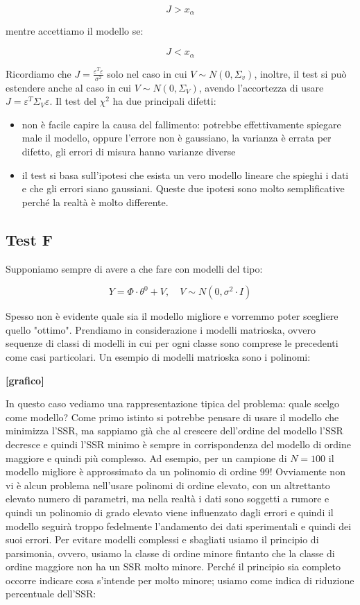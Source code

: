     \[ J>x_\alpha \]

mentre accettiamo il modello se:

    \[ J<x_\alpha \]

Ricordiamo che $J=\frac{\varepsilon^T\varepsilon}{\sigma^2}$ solo nel caso in cui $V\sim N(0,\Sigma_v)$, inoltre, il test si può estendere anche al caso in cui $V\sim N(0,\Sigma_V)$, avendo l'accortezza di usare $J=\varepsilon^T\Sigma_V\varepsilon$. \newline
Il test del $\chi^2$ ha due principali difetti:
\begin{itemize}
  \item non è facile capire la causa del fallimento: potrebbe effettivamente spiegare male il modello, oppure l'errore non è gaussiano, la varianza è errata per difetto, gli errori di misura hanno varianze diverse
  \item il test si basa sull'ipotesi che esista un vero modello lineare che spieghi i dati e che gli errori siano gaussiani. Queste due ipotesi sono molto semplificative perché la realtà è molto differente.
\end{itemize}
\subsection{Test F}
Supponiamo sempre di avere a che fare con modelli del tipo:

    \[ Y=\Phi\cdot\theta^0+V,  \quad  V\sim N(0,\sigma^2\cdot I) \]

Spesso non è evidente quale sia il modello migliore e vorremmo poter scegliere quello "ottimo". Prendiamo in considerazione i modelli matrioska, ovvero sequenze di classi di modelli in cui per ogni classe sono comprese le precedenti come casi particolari. Un esempio di modelli matrioska sono i polinomi:
\begin{center}
\textbf{[grafico]}
\end{center}
In questo caso vediamo una rappresentazione tipica del problema: quale scelgo come modello? Come primo istinto si potrebbe pensare di usare il modello che minimizza l'SSR, ma sappiamo già che al crescere dell'ordine del modello l'SSR decresce e quindi l'SSR minimo è sempre in corrispondenza del modello di ordine maggiore e quindi più complesso. Ad esempio, per un campione di $N=100$ il modello migliore è approssimato da un polinomio di ordine $99$! Ovviamente non vi è alcun problema nell'usare polinomi di ordine elevato, con un altrettanto elevato numero di parametri, ma nella realtà i dati sono soggetti a rumore e quindi un polinomio di grado elevato viene influenzato dagli errori e quindi il modello seguirà troppo fedelmente l'andamento dei dati sperimentali e quindi dei suoi errori.\newline
Per evitare modelli complessi e sbagliati usiamo il principio di parsimonia, ovvero, usiamo la classe di ordine minore fintanto che la classe di ordine maggiore non ha un SSR molto minore. Perché il principio sia completo occorre indicare cosa s'intende per molto minore; usiamo come indica di riduzione percentuale dell'SSR:


